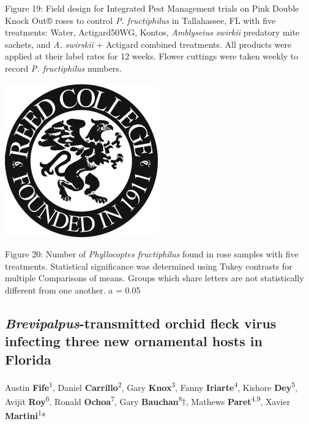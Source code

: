 \documentclass[12pt,final,CPage]{ufthesis}
\begin{document}
{  Figure 19: Field design for Integrated Pest Management trials on Pink Double Knock Out® roses to control \emph{P. fructiphilus} in Tallahassee, FL with five treatments: Water, Actigard50WG, Kontos, \emph{Amblyseius swirkii} predatory mite sachets, and \emph{A. swirskii} + Actigard combined treatments. All products were applied at their label rates for 12 weeks. Flower cuttings were taken weekly to record \emph{P. fructiphilus} numbers.
  \begin{center}\includegraphics[width=0.8\linewidth]{figure/reed} \end{center}

  Figure 20: Number of \emph{Phyllocoptes fructiphilus} found in rose samples with five treatments. Statistical significance was determined using Tukey contrasts for multiple Comparisons of means. Groups which share letters are not statistically different from one another. a = 0.05

  \hypertarget{brevipalpus-transmitted-orchid-fleck-virus-infecting-three-new-ornamental-hosts-in-florida}{%
  \subsection{\texorpdfstring{\emph{Brevipalpus}-transmitted orchid fleck virus infecting three new ornamental hosts in Florida}{Brevipalpus-transmitted orchid fleck virus infecting three new ornamental hosts in Florida}}\label{brevipalpus-transmitted-orchid-fleck-virus-infecting-three-new-ornamental-hosts-in-florida}}

  Austin \textbf{Fife}\textsuperscript{1}, Daniel \textbf{Carrillo}\textsuperscript{2}, Gary \textbf{Knox}\textsuperscript{3}, Fanny \textbf{Iriarte}\textsuperscript{4}, Kishore \textbf{Dey}\textsuperscript{5}, Avijit \textbf{Roy}\textsuperscript{6}, Ronald \textbf{Ochoa}\textsuperscript{7}, Gary \textbf{Bauchan}\textsuperscript{8}\(\dagger\), Mathews \textbf{Paret}\textsuperscript{4,9}, Xavier \textbf{Martini}\textsuperscript{1}*

}
\end{document}
